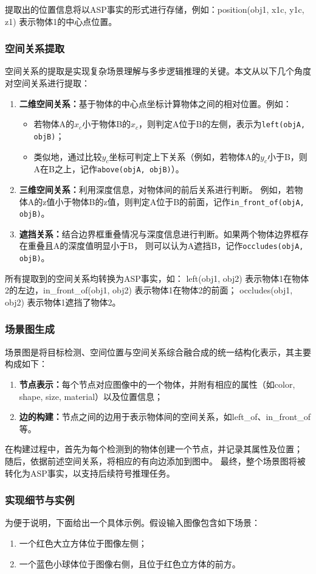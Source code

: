 提取出的位置信息将以ASP事实的形式进行存储，例如：position(obj1, x1c, y1c, z1) 表示物体1的中心点位置。
\subsubsection{空间关系提取}
空间关系的提取是实现复杂场景理解与多步逻辑推理的关键。本文从以下几个角度对空间关系进行提取：
\begin{enumerate}[itemsep=0.5em] 
\item \textbf{二维空间关系：}基于物体的中心点坐标计算物体之间的相对位置。例如： 
    \begin{itemize}[leftmargin=2em] 
        \item 若物体A的$x_c$小于物体B的$x_c$，则判定A位于B的左侧，表示为\texttt{left(objA, objB)}； 
        \item 类似地，通过比较$y_c$坐标可判定上下关系（例如，若物体A的$y_c$小于B，则A在B之上，记作\texttt{above(objA, objB)}）。 
    \end{itemize} 
\item \textbf{三维空间关系：}利用深度信息，对物体间的前后关系进行判断。
例如，若物体A的z值小于物体B的z值，则判定A位于B的前面，记作\texttt{in\_front\_of(objA, objB)}。 
\item \textbf{遮挡关系：}结合边界框重叠情况与深度信息进行判断。如果两个物体边界框存在重叠且A的深度值明显小于B，
则可以认为A遮挡B，记作\texttt{occludes(objA, objB)}。 
\end{enumerate}
所有提取到的空间关系均转换为ASP事实，如：
left(obj1, obj2) 表示物体1在物体2的左边，in\_front\_of(obj1, obj2) 表示物体1在物体2的前面；
occludes(obj1, obj2) 表示物体1遮挡了物体2。
\subsubsection{场景图生成}
场景图是将目标检测、空间位置与空间关系综合融合成的统一结构化表示，其主要构成如下： 
\begin{enumerate}[nosep] 
    \item \textbf{节点表示：}每个节点对应图像中的一个物体，并附有相应的属性（如color, shape, size, material）以及位置信息； 
    \item \textbf{边的构建：}节点之间的边用于表示物体间的空间关系，如left\_of、in\_front\_of等。 
\end{enumerate}

在构建过程中，首先为每个检测到的物体创建一个节点，并记录其属性及位置；
随后，依据前述空间关系，将相应的有向边添加到图中。
最终，整个场景图将被转化为ASP事实，以支持后续符号推理任务。
\subsubsection{实现细节与实例}
为便于说明，下面给出一个具体示例。假设输入图像包含如下场景： 
\begin{enumerate}[nosep] 
    \item 一个红色大立方体位于图像左侧； 
    \item 一个蓝色小球体位于图像右侧，且位于红色立方体的前方。 
\end{enumerate}

